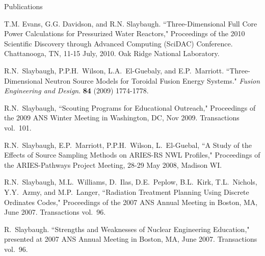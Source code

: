 \documentclass{resume2} %
\begin{document}
\begin{rSection}{Publications}
\begin{bibsection}
\item T.M. Evans, G.G. Davidson, and R.N. Slaybaugh.  ``Three-Dimensional Full Core Power Calculations for Pressurized Water Reactors," Proceedings of the 2010 Scientific Discovery through Advanced Computing (SciDAC) Conference. Chattanooga, TN, 11-15 July, 2010. Oak Ridge National Laboratory.

\item R.N.\ Slaybaugh, P.P.H.\ Wilson, L.A.\ El-Guebaly, and E.P.\ Marriott. ``Three-Dimensional Neutron Source Models for Toroidal Fusion Energy Systems." \textit{Fusion Engineering and Design}. \textbf{84} (2009) 1774-1778. 

\item R.N.\ Slaybaugh, ``Scouting Programs for Educational Outreach," Proceedings of the 2009 ANS Winter Meeting in Washington, DC, Nov 2009. Transactions vol.\ 101.

\item R.N.\ Slaybaugh, E.P.\ Marriott, P.P.H.\ Wilson, L.\ El-Guebal, ``A Study of the Effects of Source Sampling Methods on ARIES-RS NWL Profiles," Proceedings of the ARIES-Pathways Project Meeting, 28-29 May 2008, Madison WI. 

\item R.N.\ Slaybaugh, M.L.\ Williams, D.\ Ilas, D.E.\ Peplow, B.L.\ Kirk, T.L.\ Nichols, Y.Y.\ Azmy, and M.P.\ Langer, ``Radiation Treatment Planning Using Discrete Ordinates Codes," Proceedings of the 2007 ANS Annual Meeting in Boston, MA, June 2007. Transactions vol.\ 96.

\item R.\ Slaybaugh. ``Strengths and Weaknesses of Nuclear Engineering Education," presented at 2007 ANS Annual Meeting in Boston, MA, June 2007. Transactions vol.\ 96.
\end{bibsection}

\end{rSection}








\end{document}
